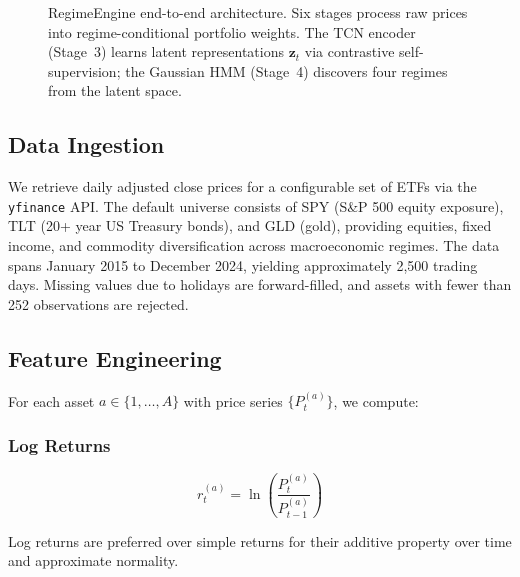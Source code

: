 \documentclass[conference, twocolumn]{IEEEtran}
\begin{document}
\begin{figure}[t]
{}
\caption{RegimeEngine end-to-end architecture. Six stages process raw prices into regime-conditional portfolio weights. The TCN encoder (Stage~3) learns latent representations $\mathbf{z}_t$ via contrastive self-supervision; the Gaussian HMM (Stage~4) discovers four regimes from the latent space.}
\label{fig:framework}
\end{figure}

\subsection{Data Ingestion}
\label{sec:data}

We retrieve daily adjusted close prices for a configurable set of ETFs via the \texttt{yfinance} API. The default universe consists of SPY (S\&P 500 equity exposure), TLT (20+ year US Treasury bonds), and GLD (gold), providing equities, fixed income, and commodity diversification across macroeconomic regimes. The data spans January 2015 to December 2024, yielding approximately 2,500 trading days. Missing values due to holidays are forward-filled, and assets with fewer than 252 observations are rejected.

\subsection{Feature Engineering}
\label{sec:features}

For each asset $a \in \{1, \ldots, A\}$ with price series $\{P_t^{(a)}\}$, we compute:

\subsubsection{Log Returns}
\begin{equation}
    r_t^{(a)} = \ln\!\left(\frac{P_t^{(a)}}{P_{t-1}^{(a)}}\right)
\label{eq:logret}
\end{equation}

Log returns are preferred over simple returns for their additive property over time and approximate normality.
\end{document}
